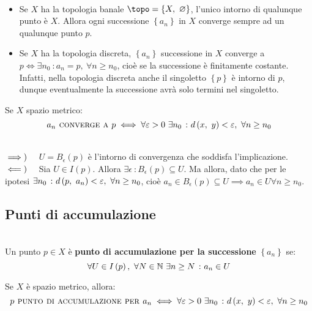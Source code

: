 \begin{examples}~{}
	\begin{itemize}
		\item Se $X$ ha la topologia banale $\topo=\left\{X,\ \emptyset\right\}$, l'unico intorno di qualunque punto è $X$. Allora ogni successione $\left\{a_n\right\}$ in $X$ converge sempre ad un qualunque punto $p$.
		\item Se $X$ ha la topologia discreta, $\left\{a_n\right\}$ successione in $X$ converge a $p\iff \exists n_0\ \colon a_n=p,\ \forall n\geq n_0$, cioè se la successione è finitamente costante. Infatti, nella topologia discreta anche il singoletto $\left\{p\right\}$ è intorno di $p$, dunque eventualmente la successione avrà solo termini nel singoletto.
	\end{itemize}
\vspace{-3mm}
\end{examples}
\begin{observe}
Se $X$ spazio metrico:
\begin{equation}
	a_n\textsc{ converge a } p\iff \forall \varepsilon>0\ \exists n_0\ \colon d\left(x,\ y\right)<\varepsilon,\ \forall n\geq n_0
\end{equation}
\vspace{-6mm}
\end{observe}
\begin{demonstration}~{}\\
	$\implies)\quad$ $U=B_{\epsilon}\left(p\right)$ è l'intorno di convergenza che soddisfa l'implicazione.\\
	$\impliedby)\quad$ Sia $U\in I\left(p\right)$. Allora $\exists \epsilon\ \colon B_{\epsilon}\left(p\right)\subseteq U$. Ma allora, dato che per le ipotesi $\exists n_0\ \colon d\left(p,\ a_n\right)<\varepsilon,\ \forall n\geq n_0$, cioè $a_n\in B_{\epsilon}\left(p\right)\subseteq U\implies a_n\in U\forall n\geq n_0$.
\end{demonstration}
\subsection{Punti di accumulazione}
\begin{define}~{}\\
	Un punto $p\in X$ è \textbf{punto di accumulazione per la successione} $\left\{a_n\right\}$ se:
	\begin{equation}
		\forall U\in I\left(p\right),\ \forall N\in\mathbb{N}\ \exists n\geq N\ \colon a_n\in U
	\end{equation}
\vspace{-6mm}
\end{define}
\begin{exercise}
	Se $X$ è spazio metrico, allora:
	\begin{equation}
		p\textsc{ punto di accumulazione per } a_n\iff \forall \epsilon>0\ \exists n_0\ \colon \mvf{d}{x}{y}<\epsilon,\ \forall n\geq n_0
	\end{equation}
\vspace{-6mm}
\end{exercise}

